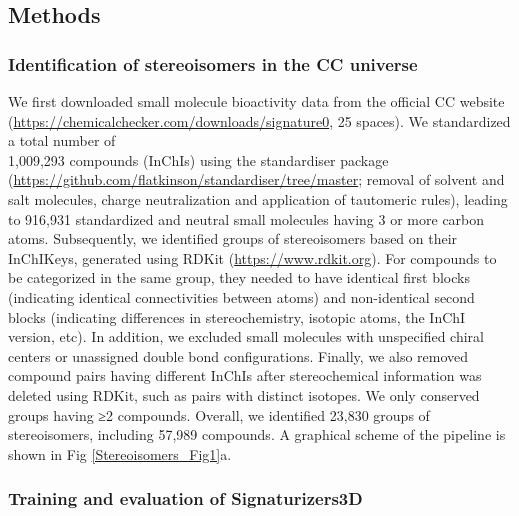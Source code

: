 \subsection{Methods}
\label{Stereoisomers_Methods}

\subsubsection{Identification of stereoisomers in the CC universe}

We first downloaded small molecule bioactivity data from the official CC website (\hyperlink{https://chemicalchecker.com/downloads/signature0}{https://chemicalchecker.com/downloads/signature0}, 25 spaces). We standardized a total number of\\ 1,009,293 compounds (InChIs) using the standardiser package (\hyperlink{https://github.com/flatkinson/standardiser/tree/master}{https://github.com/flatkinson/standardiser/tree/master}; removal of solvent and salt molecules, charge neutralization and application of tautomeric rules), leading to 916,931 standardized and neutral small molecules having 3 or more carbon atoms. Subsequently, we identified groups of stereoisomers based on their InChIKeys\cite{heller_inchi_2015}, generated using RDKit (\hyperlink{https://www.rdkit.org}{https://www.rdkit.org}). For compounds to be categorized in the same group, they needed to have identical first blocks (indicating identical connectivities between atoms) and non-identical second blocks (indicating differences in stereochemistry, isotopic atoms, the InChI version, etc). In addition, we excluded small molecules with unspecified chiral centers or unassigned double bond configurations. Finally, we also removed compound pairs having different InChIs after stereochemical information was deleted using RDKit, such as pairs with distinct isotopes. We only conserved groups having ≥2 compounds. Overall, we identified 23,830 groups of stereoisomers, including 57,989 compounds. A graphical scheme of the pipeline is shown in Fig \ref{Stereoisomers_Fig1}a.


\subsubsection{Training and evaluation of Signaturizers3D}

